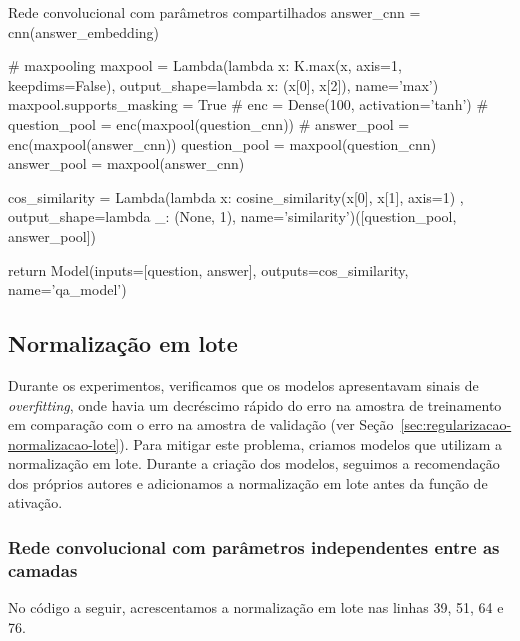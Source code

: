 \begin{mypython-linenumber}{Rede convolucional com parâmetros compartilhados}
            answer_cnn = cnn(answer_embedding)

        # maxpooling
        maxpool = Lambda(lambda x: K.max(x, axis=1, keepdims=False), output_shape=lambda x: (x[0], x[2]),
                         name='max')
        maxpool.supports_masking = True
        # enc = Dense(100, activation='tanh')
        # question_pool = enc(maxpool(question_cnn))
        # answer_pool = enc(maxpool(answer_cnn))
        question_pool = maxpool(question_cnn)
        answer_pool = maxpool(answer_cnn)

        cos_similarity = Lambda(lambda x: cosine_similarity(x[0], x[1], axis=1)
                                       , output_shape=lambda _: (None, 1), name='similarity')([question_pool,
                                                                                               answer_pool])
        

        return Model(inputs=[question, answer], outputs=cos_similarity,
                                   name='qa_model')
\end{mypython-linenumber}

\vspace{2cm}
\subsection{Normalização em lote}

Durante os experimentos, verificamos que os modelos apresentavam sinais de \textit{overfitting}, onde havia um decréscimo rápido do erro na amostra de treinamento em comparação com o erro na amostra de validação (ver Seção~\ref{sec:regularizacao-normalizacao-lote}). Para mitigar este problema, criamos modelos que utilizam a normalização em lote. Durante a criação dos modelos, seguimos a recomendação dos próprios autores  e adicionamos a normalização em lote antes da função de ativação.

\subsubsection{Rede convolucional com parâmetros independentes entre as camadas}

No código a seguir, acrescentamos a normalização em lote nas linhas 39, 51, 64 e 76.

